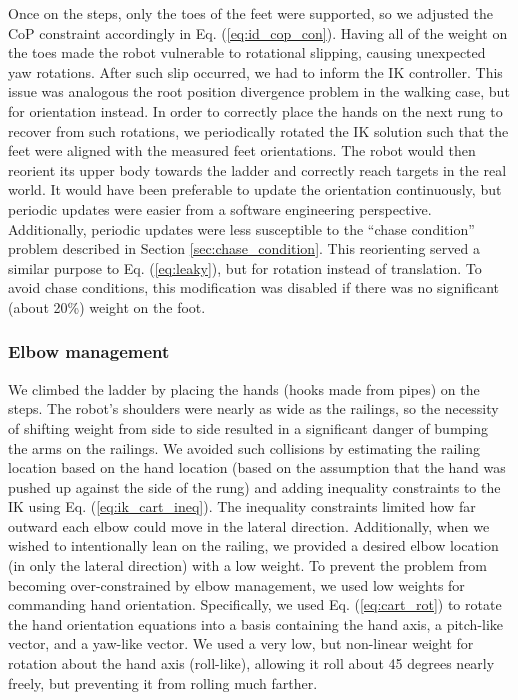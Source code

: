 \documentclass{ws-ijhr}
\newcommand{\eref}[1] {Eq. (\ref{#1})}
\newcommand{\sref}[1] {Section \ref{#1}}
\begin{document}
Once on the steps, only the toes of the feet were supported, so we adjusted
the CoP constraint accordingly in \eref{eq:id_cop_con}. 
Having all of the weight on the toes made the robot vulnerable to rotational
slipping, causing unexpected yaw rotations.
After such slip occurred, we had to inform the IK controller. 
This issue was analogous the root position divergence problem in the walking
case, but for orientation instead.
In order to correctly place the hands on the next rung to recover from such 
rotations, we periodically rotated the IK solution such that the feet were
aligned with the measured feet orientations. 
The robot would then reorient its upper body towards the ladder and correctly 
reach targets in the real world.  
It would have been preferable to update the orientation continuously, but 
periodic updates were easier from a software engineering perspective.  
Additionally, periodic updates were less susceptible to the ``chase condition''
problem described in \sref{sec:chase_condition}. 
This reorienting served a similar purpose to \eref{eq:leaky}, but for 
rotation instead of translation. 
To avoid chase conditions, this modification was disabled if there was no 
significant (about 20\%) weight on the foot.

\subsubsection{Elbow management}
We climbed the ladder by placing the hands (hooks made from pipes) on the steps.
The robot's shoulders were nearly as wide as the railings, so the necessity of 
shifting weight from side to side resulted in a significant danger of bumping 
the arms on the railings. 
We avoided such collisions by estimating the railing location based on the hand
location (based on the assumption that the hand was pushed up against the side
of the rung) and adding inequality constraints to the IK using \eref{eq:ik_cart_ineq}. 
The inequality constraints limited how far outward each elbow could move in the 
lateral direction. 
Additionally, when we wished to intentionally lean on the railing, we provided 
a desired elbow location (in only the lateral direction) with a low weight. 
To prevent the problem from becoming over-constrained by elbow management, we 
used low weights for commanding hand orientation. 
Specifically, we used \eref{eq:cart_rot} to rotate the hand orientation equations
into a basis containing the hand axis, a pitch-like vector, and a yaw-like vector.
We used a very low, but non-linear weight for rotation about the hand axis 
(roll-like), allowing it roll about 45 degrees nearly freely, but preventing it 
from rolling much farther.
\end{document}
